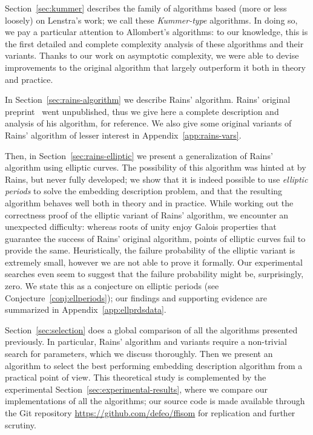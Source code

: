 \documentclass[12pt]{article}
\theoremstyle{plain}
\theoremstyle{definition}
\newcounter{algorithm}
\begin{document}
Section~\ref{sec:kummer} describes the family of algorithms based
(more or less loosely) on Lenstra's work; we call these
\emph{Kummer-type} algorithms. %
In doing so, we pay a particular attention to Allombert's algorithms:
to our knowledge, this is the first detailed and complete complexity
analysis of these algorithms and their variants. %
Thanks to our work on asymptotic complexity, we were able to devise
improvements to the original algorithm that largely outperform it both
in theory and practice. %

In Section~\ref{sec:rains-algorithm} we describe Rains' algorithm. %
Rains' original preprint~\cite{rains2008} went unpublished, thus we
give here a complete description and analysis of his algorithm, for
reference. %
We also give some original variants of Rains' algorithm of lesser
interest in Appendix~\ref{app:rains-vars}.

Then, in Section~\ref{sec:rains-elliptic} we present a generalization
of Rains' algorithm using elliptic curves. %
The possibility of this algorithm was hinted at by Rains, but never
fully developed; we show that it is indeed possible to use
\emph{elliptic periods} to solve the embedding description problem,
and that the resulting algorithm behaves well both in theory and in
practice. %
While working out the correctness proof of the elliptic variant of
Rains' algorithm, we encounter an unexpected difficulty: whereas roots
of unity enjoy Galois properties that guarantee the success of Rains'
original algorithm, points of elliptic curves fail to provide the
same. %
Heuristically, the failure probability of the elliptic variant is
extremely small, however we are not able to prove it formally. %
Our experimental searches even seem to suggest that the failure
probability might be, surprisingly, zero. %
We state this as a conjecture on elliptic periods (see
Conjecture~\ref{conj:ellperiods}); our findings and supporting
evidence are summarized in Appendix~\ref{app:ellprdsdata}.

Section~\ref{sec:selection} does a global comparison of all the
algorithms presented previously. %
In particular, Rains' algorithm and variants require a non-trivial
search for parameters, which we discuss thoroughly. %
Then we present an algorithm to select the best performing embedding
description algorithm from a practical point of view. %
This theoretical study is complemented by the experimental
Section~\ref{sec:experimental-results}, where we compare our
implementations of all the algorithms; our source code is made
available through the Git repository
\url{https://github.com/defeo/ffisom} for replication and further
scrutiny.
\end{document}
